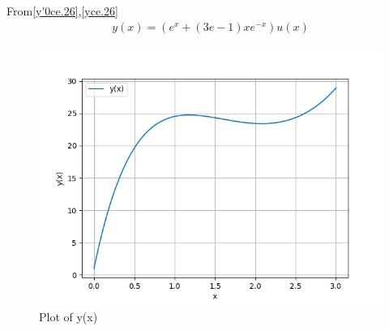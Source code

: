 \documentclass[journal,12pt,twocolumn]{IEEEtran}
\theoremstyle{remark}
\begin{document}
From\eqref{y'0ce.26},\eqref{yce.26}
\begin{align}
	y(x)=(e^x+(3e-1)xe^{-x})u(x)
\end{align}
\begin{figure}[h!]
    \centering
    \includegraphics[width=1\linewidth]{2021/CE/26/figures/figure1.png}
        \caption{Plot of y(x)}
\end{figure}


\end{document}
